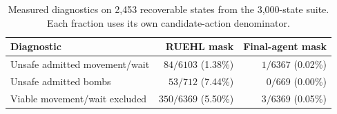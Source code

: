 \begin{table}[htbp]
\centering\small
\begin{tabularx}{\textwidth}{@{}Yrr@{}}
\toprule
Diagnostic & RUEHL mask & Final-agent mask \\
\midrule
Unsafe admitted movement/wait & $84/6103$ (1.38\%) & $1/6367$ (0.02\%) \\
Unsafe admitted bombs & $53/712$ (7.44\%) & $0/669$ (0.00\%) \\
Viable movement/wait excluded & $350/6369$ (5.50\%) & $3/6369$ (0.05\%) \\
\bottomrule
\end{tabularx}
\caption{Measured diagnostics on 2,453 recoverable states from the 3,000-state suite. Each fraction uses its own candidate-action denominator.}
\label{tab:jesper-mask-audit}
\end{table}
